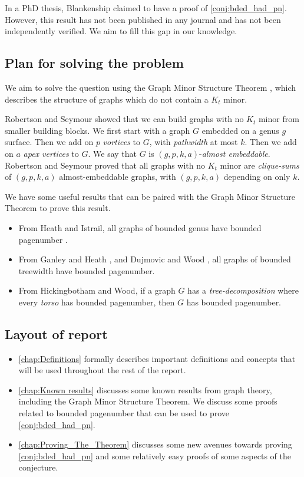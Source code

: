 \documentclass[]{report}
\theoremstyle{definition}
\numberwithin{theorem}{section}
\numberwithin{equation}{section}
\begin{document}
In a PhD thesis, Blankenship claimed to have a proof of \cref{conj:bded_had_pn}.\cite{Blankenship-PhD03} However, this result has not been published in any journal and has not been independently verified. We aim to fill this gap in our knowledge. 
\subsection{Plan for solving the problem}
We aim to solve the question using the Graph Minor Structure Theorem \cite{robertsonGraphMinorsXVI2003}, which describes the structure of graphs which do not contain a $K_t$ minor.
\par
Robertson and Seymour showed that we can build graphs with no $K_t$ minor from smaller building blocks. We first start with a graph $G$ embedded on a genus $g$ surface. Then we add on $p$ \textit{vortices} to $G$, with \textit{pathwidth} at most $k$. Then we add on $a$ \textit{apex vertices} to $G$. We say that $G$ is $(g, p, k, a)$-\textit{almost embeddable}. Robertson and Seymour \cite{robertsonGraphMinorsXVI2003} proved that all graphs with no $K_t$ minor are \textit{clique-sums} of $(g, p, k, a)$ almost-embeddable graphs, with $(g, p, k, a)$ depending on only $k$. 
\par
We have some useful results that can be paired with the Graph Minor Structure Theorem to prove this result.
\begin{itemize}
	\item From Heath and Istrail, all graphs of bounded genus have bounded pagenumber \cite{heathPagenumberGenusGraphs1992}.
	\item From Ganley and Heath \cite{ganleyPagenumberTrees2001}, and Dujmovic and Wood \cite{dujmovicGraphTreewidthGeometric2007}, all graphs of bounded treewidth have bounded pagenumber.
	\item From Hickingbotham and Wood\cite{hickingbothamStackNumberCliqueSum2023}, if a graph $G$ has a \textit{tree-decomposition} where every \textit{torso} has bounded pagenumber, then $G$ has bounded pagenumber. 
\end{itemize}

\subsection{Layout of report}
\begin{itemize}
	\item \cref{chap:Definitions} formally describes important definitions and concepts that will be used throughout the rest of the report.
	\item \cref{chap:Known results} discusses some known results from graph theory, including the Graph Minor Structure Theorem. We discuss some proofs related to bounded pagenumber that can be used to prove \cref{conj:bded_had_pn}.
	
	\item \cref{chap:Proving_The_Theorem} discusses some new avenues towards proving \cref{conj:bded_had_pn} and some relatively easy proofs of some aspects of the conjecture. 
\end{itemize}
\end{document}
